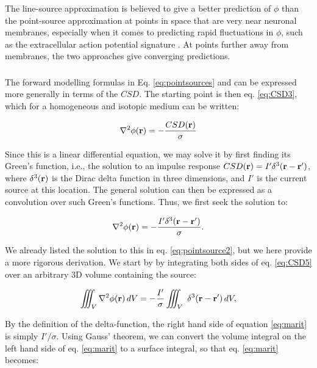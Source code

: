 The line-source approximation is believed to give a better prediction of $\phi$ than the point-source approximation at points in space that are very near neuronal membranes, especially when it comes to predicting rapid fluctuations in $\phi$, such as the extracellular action potential signature \citep{Holt1999}. At points further away from membranes, the two approaches give converging predictions.


\subsubsection{}
The forward modelling formulas in Eq. \ref{eq:pointsources} and \label{eq:linesources} can be expressed more generally in terms of the $CSD$. The starting point is then eq. \ref{eq:CSD3}, which for a homogeneous and isotopic medium can be written: 

\begin{equation}
\nabla^2 \phi({\bf r}) = - \frac{CSD({\bf r})}{\sigma}
\label{eq:CSD4}
\end{equation}

Since this is a linear differential equation, we may solve it by first finding its Green's function, i.e., the solution to an impulse response $CSD({\bf r}) = I' \delta^3({\bf r-r'})$, where $\delta^3({\bf r})$ is the Dirac delta function in three dimensions, and $I'$ is the current source at this location. The general solution can then be expressed as a convolution over such Green's functions. Thus, we first seek the solution to: 

\begin{equation}
\nabla^2 \phi({\bf r}) = - \frac{I' \delta^3({\bf r-r'})}{\sigma}.
\label{eq:CSD5}
\end{equation}

We already listed the solution to this in eq. \ref{eq:pointsource2}, but we here provide a more rigorous derivation. We start by by integrating both sides of eq. \ref{eq:CSD5} over an arbitrary 3D volume containing the source:

\begin{equation}
\iiint_V \nabla^2\phi({\bf r}) \,dV =  - \frac{I'}{\sigma} \iiint_V \ \delta^3({\bf r-r'}) \, dV,
\label{eq:marit}
\end{equation}

By the definition of the delta-function, the right hand side of equation \ref{eq:marit} is simply $I'/\sigma$. Using Gauss' theorem, we can convert the volume integral on the left hand side of eq. \ref{eq:marit} to a surface integral, so that eq. \ref{eq:marit} becomes:

